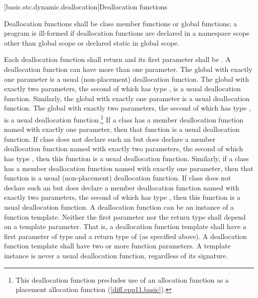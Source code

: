 [basic.stc.dynamic.deallocation]{Deallocation functions}

\pnum
{}%
Deallocation functions shall be class member functions or global
functions; a program is ill-formed if deallocation functions are
declared in a namespace scope other than global scope or declared static
in global scope.

\pnum
{}%
Each deallocation function shall return  and its first
parameter shall be . A deallocation function can have more
than one parameter.
The global  with exactly one parameter is a usual
(non-placement) deallocation function. The global  with
exactly two parameters, the second of which has type , is a usual
deallocation function. Similarly, the global  with exactly one
parameter is a usual deallocation function. The global  with
exactly two parameters, the second of which has type , is a usual
deallocation function.\footnote{This deallocation function precludes use of an
allocation function  as a placement
allocation function (\ref{diff.cpp11.basic}).}
If a class  has a member deallocation
function named   with exactly one
parameter, then that function is a usual deallocation
function. If class  does not declare such an 
 but does declare a member deallocation function named
  with exactly two parameters, the second
of which has type , then this
function is a usual deallocation function. Similarly, if a class
 has a member deallocation function named 
 with exactly one parameter, then that function is a
usual (non-placement) deallocation function. If class  does not
declare such an   but does declare a
member deallocation function named  
with exactly two parameters, the second of which has type
, then this function is a usual deallocation
function. A deallocation function can be an instance of a function
template. Neither the first parameter nor the return type shall depend
on a template parameter. \enternote That is, a deallocation function
template shall have a first parameter of type  and a return
type of  (as specified above). \exitnote A deallocation
function template shall have two or more function parameters. A template
instance is never a usual deallocation function, regardless of its
signature.

